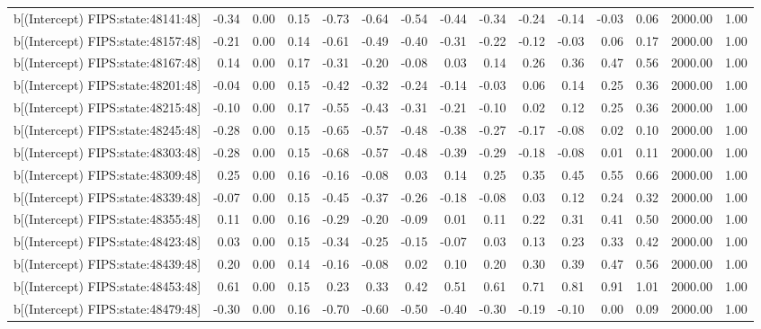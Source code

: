 \begin{table}[ht]
\begin{tabular}{rrrrrrrrrrrrrrr}
  b[(Intercept) FIPS:state:48141:48] & -0.34 & 0.00 & 0.15 & -0.73 & -0.64 & -0.54 & -0.44 & -0.34 & -0.24 & -0.14 & -0.03 & 0.06 & 2000.00 & 1.00 \\ 
  b[(Intercept) FIPS:state:48157:48] & -0.21 & 0.00 & 0.14 & -0.61 & -0.49 & -0.40 & -0.31 & -0.22 & -0.12 & -0.03 & 0.06 & 0.17 & 2000.00 & 1.00 \\ 
  b[(Intercept) FIPS:state:48167:48] & 0.14 & 0.00 & 0.17 & -0.31 & -0.20 & -0.08 & 0.03 & 0.14 & 0.26 & 0.36 & 0.47 & 0.56 & 2000.00 & 1.00 \\ 
  b[(Intercept) FIPS:state:48201:48] & -0.04 & 0.00 & 0.15 & -0.42 & -0.32 & -0.24 & -0.14 & -0.03 & 0.06 & 0.14 & 0.25 & 0.36 & 2000.00 & 1.00 \\ 
  b[(Intercept) FIPS:state:48215:48] & -0.10 & 0.00 & 0.17 & -0.55 & -0.43 & -0.31 & -0.21 & -0.10 & 0.02 & 0.12 & 0.25 & 0.36 & 2000.00 & 1.00 \\ 
  b[(Intercept) FIPS:state:48245:48] & -0.28 & 0.00 & 0.15 & -0.65 & -0.57 & -0.48 & -0.38 & -0.27 & -0.17 & -0.08 & 0.02 & 0.10 & 2000.00 & 1.00 \\ 
  b[(Intercept) FIPS:state:48303:48] & -0.28 & 0.00 & 0.15 & -0.68 & -0.57 & -0.48 & -0.39 & -0.29 & -0.18 & -0.08 & 0.01 & 0.11 & 2000.00 & 1.00 \\ 
  b[(Intercept) FIPS:state:48309:48] & 0.25 & 0.00 & 0.16 & -0.16 & -0.08 & 0.03 & 0.14 & 0.25 & 0.35 & 0.45 & 0.55 & 0.66 & 2000.00 & 1.00 \\ 
  b[(Intercept) FIPS:state:48339:48] & -0.07 & 0.00 & 0.15 & -0.45 & -0.37 & -0.26 & -0.18 & -0.08 & 0.03 & 0.12 & 0.24 & 0.32 & 2000.00 & 1.00 \\ 
  b[(Intercept) FIPS:state:48355:48] & 0.11 & 0.00 & 0.16 & -0.29 & -0.20 & -0.09 & 0.01 & 0.11 & 0.22 & 0.31 & 0.41 & 0.50 & 2000.00 & 1.00 \\ 
  b[(Intercept) FIPS:state:48423:48] & 0.03 & 0.00 & 0.15 & -0.34 & -0.25 & -0.15 & -0.07 & 0.03 & 0.13 & 0.23 & 0.33 & 0.42 & 2000.00 & 1.00 \\ 
  b[(Intercept) FIPS:state:48439:48] & 0.20 & 0.00 & 0.14 & -0.16 & -0.08 & 0.02 & 0.10 & 0.20 & 0.30 & 0.39 & 0.47 & 0.56 & 2000.00 & 1.00 \\ 
  b[(Intercept) FIPS:state:48453:48] & 0.61 & 0.00 & 0.15 & 0.23 & 0.33 & 0.42 & 0.51 & 0.61 & 0.71 & 0.81 & 0.91 & 1.01 & 2000.00 & 1.00 \\ 
  b[(Intercept) FIPS:state:48479:48] & -0.30 & 0.00 & 0.16 & -0.70 & -0.60 & -0.50 & -0.40 & -0.30 & -0.19 & -0.10 & 0.00 & 0.09 & 2000.00 & 1.00 \\ 

\end{tabular}
\end{table}
